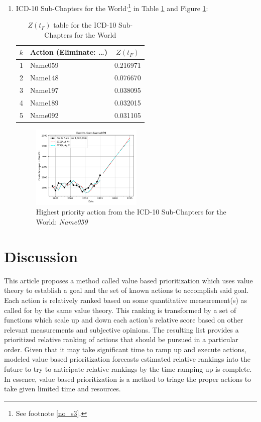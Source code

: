 \documentclass[10pt, a4paper, twocolumn]{IEEEconf}
\begin{document}
\begin{enumerate}
  \item ICD-10 Sub-Chapters for the World\cite{whomortality}\textsuperscript{,}\footnote{See footnote \ref{no_s3}.} in Table \ref{table:ztable11} and Figure \ref{fig:k11}:
    \begin{table}[H]
      \centering
      \begin{tabular}{clc}
        \toprule
          $k$ & Action (Eliminate: \ldots) & $Z(t_F)$ \\
        \midrule
          1   & Name059 & 0.216971 \\
          2   & Name148 & 0.076670 \\
          3   & Name197 & 0.038095 \\
          4   & Name189 & 0.032015 \\
          5   & Name092 & 0.031105 \\
        \bottomrule
      \end{tabular}
      \caption{$Z(t_F)$ table for the ICD-10 Sub-Chapters for the World}
      \label{table:ztable11}
    \end{table}
    \begin{figure}[H]
      \centering
      \includegraphics[width=0.5\textwidth]{results/WORLD_ICD10_SUB_CHAPTERS/Name059_ets.png}
      \caption{Highest priority action from the ICD-10 Sub-Chapters for the World: \textit{Name059}}\label{fig:k11}
    \end{figure}
\end{enumerate}

\section{Discussion}

This article proposes a method called value based prioritization which uses value theory to establish a goal and the set of known actions to accomplish said goal.
Each action is relatively ranked based on some quantitative measurement(s) as called for by the same value theory.
This ranking is transformed by a set of functions which scale up and down each action's relative score based on other relevant measurements and subjective opinions.
The resulting list provides a prioritized relative ranking of actions that should be pursued in a particular order.
Given that it may take significant time to ramp up and execute actions, modeled value based prioritization forecasts estimated relative rankings into the future to try to anticipate relative rankings by the time ramping up is complete.
In essence, value based prioritization is a method to triage the proper actions to take given limited time and resources.
\end{document}
